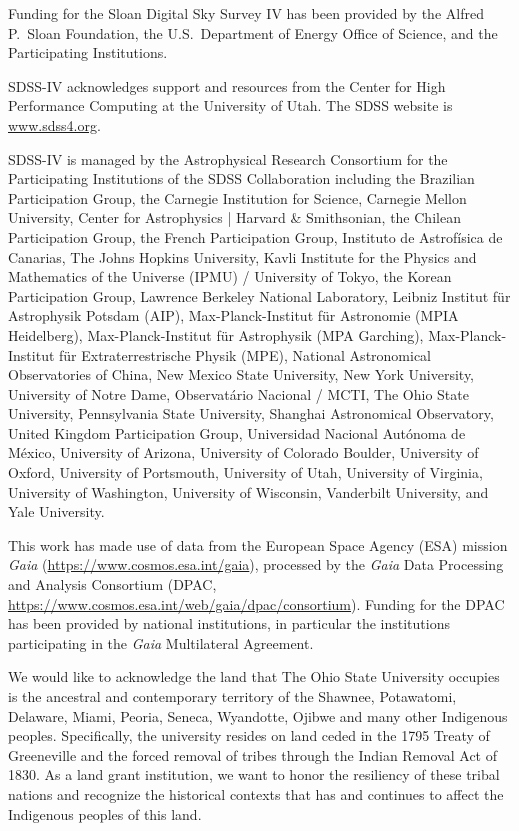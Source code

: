 \documentclass[twocolumn,twocolappendix,linenumbers]{aastex631}
\begin{document}
Funding for the Sloan Digital Sky 
Survey IV has been provided by the 
Alfred P.\ Sloan Foundation, the U.S.\ 
Department of Energy Office of 
Science, and the Participating 
Institutions. 

SDSS-IV acknowledges support and 
resources from the Center for High 
Performance Computing  at the 
University of Utah. The SDSS 
website is \url{www.sdss4.org}.

SDSS-IV is managed by the 
Astrophysical Research Consortium 
for the Participating Institutions 
of the SDSS Collaboration including 
the Brazilian Participation Group, 
the Carnegie Institution for Science, 
Carnegie Mellon University, Center for 
Astrophysics | Harvard \& 
Smithsonian, the Chilean Participation 
Group, the French Participation Group, 
Instituto de Astrof\'isica de 
Canarias, The Johns Hopkins 
University, Kavli Institute for the 
Physics and Mathematics of the 
Universe (IPMU) / University of 
Tokyo, the Korean Participation Group, 
Lawrence Berkeley National Laboratory, 
Leibniz Institut f\"ur Astrophysik 
Potsdam (AIP),  Max-Planck-Institut 
f\"ur Astronomie (MPIA Heidelberg), 
Max-Planck-Institut f\"ur 
Astrophysik (MPA Garching), 
Max-Planck-Institut f\"ur 
Extraterrestrische Physik (MPE), 
National Astronomical Observatories of 
China, New Mexico State University, 
New York University, University of 
Notre Dame, Observat\'ario 
Nacional / MCTI, The Ohio State 
University, Pennsylvania State 
University, Shanghai 
Astronomical Observatory, United 
Kingdom Participation Group, 
Universidad Nacional Aut\'onoma 
de M\'exico, University of Arizona, 
University of Colorado Boulder, 
University of Oxford, University of 
Portsmouth, University of Utah, 
University of Virginia, University 
of Washington, University of 
Wisconsin, Vanderbilt University, 
and Yale University.

This work has made use of data from the European Space Agency (ESA) mission
{\it Gaia} (\url{https://www.cosmos.esa.int/gaia}), processed by the {\it Gaia}
Data Processing and Analysis Consortium (DPAC,
\url{https://www.cosmos.esa.int/web/gaia/dpac/consortium}). Funding for the DPAC
has been provided by national institutions, in particular the institutions
participating in the {\it Gaia} Multilateral Agreement.

We would like to acknowledge the land that The Ohio State University occupies is the ancestral and contemporary territory of the Shawnee, Potawatomi, Delaware, Miami, Peoria, Seneca, Wyandotte, Ojibwe and many other Indigenous peoples. Specifically, the university resides on land ceded in the 1795 Treaty of Greeneville and the forced removal of tribes through the Indian Removal Act of 1830. As a land grant institution, we want to honor the resiliency of these tribal nations and recognize the historical contexts that has and continues to affect the Indigenous peoples of this land.
\end{document}
